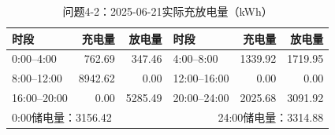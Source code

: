 \begin{table}[H]\centering\small
\caption{问题4-2：2025-06-21实际充放电量（kWh）}
\label{tab:q4_2_0621_storage}
\begin{tabular}{lrrlrr}\toprule
时段 & 充电量 & 放电量 & 时段 & 充电量 & 放电量\\\midrule
0:00--4:00 & 762.69 & 347.46 & 4:00--8:00 & 1339.92 & 1719.95 \\
8:00--12:00 & 8942.62 & 0.00 & 12:00--16:00 & 0.00 & 0.00 \\
16:00--20:00 & 0.00 & 5285.49 & 20:00--24:00 & 2025.68 & 3091.92 \\
\midrule\multicolumn{3}{l}{0:00储电量：3156.42} & \multicolumn{3}{r}{24:00储电量：3314.88}\\
\bottomrule\end{tabular}\end{table}
